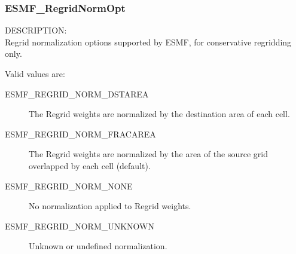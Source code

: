 \subsubsection{ESMF\_RegridNormOpt}

{\sf DESCRIPTION:\\}
Regrid normalization options supported by ESMF, for conservative regridding only.

Valid values are:
\begin{description}
   \item [ESMF\_REGRID\_NORM\_DSTAREA]
         The Regrid weights are normalized by the destination area of each cell. 
   \item [ESMF\_REGRID\_NORM\_FRACAREA]
         The Regrid weights are normalized by the area of the source grid
         overlapped by each cell (default).
   \item [ESMF\_REGRID\_NORM\_NONE]
         No normalization applied to Regrid weights.
   \item [ESMF\_REGRID\_NORM\_UNKNOWN]
         Unknown or undefined normalization.
\end{description}
